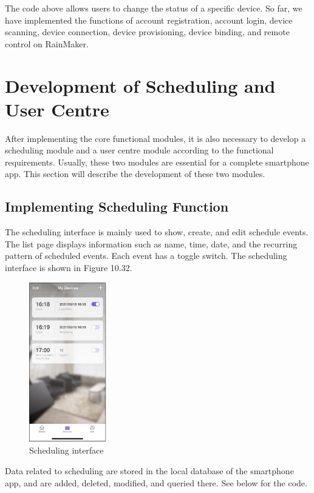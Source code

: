 \documentclass[a4paper,12pt,openany]{book}
\begin{document}
The code above allows users to change the status of a specific device. So far, we have implemented the functions of account registration, account login, device scanning, device connection, device provisioning, device binding, and remote control on RainMaker.

\section{Development of Scheduling and User Centre}
After implementing the core functional modules, it is also necessary to develop a scheduling module and a user centre module according to the functional requirements. Usually, these two modules are essential for a complete smartphone app. This section will describe the development of these two modules.

\subsection{Implementing Scheduling Function}
The scheduling interface is mainly used to show, create, and edit schedule events. The list page displays information such as name, time, date, and the recurring pattern of scheduled events. Each event has a toggle switch. The scheduling interface is shown in Figure 10.32.

\begin{figure}[ht]
    \centering
    \includegraphics[width=0.3\textwidth]{D10Z/10-32}
    \caption{Scheduling interface}
\end{figure}

Data related to scheduling are stored in the local database of the smartphone app, and are added, deleted, modified, and queried there. See below for the code.
\end{document}

